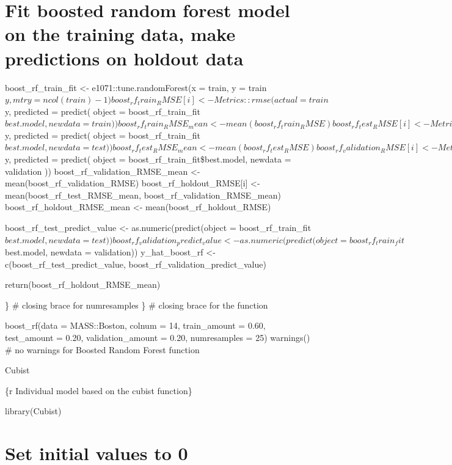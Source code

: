\documentclass[
]{book}
\begin{document}
\chapter{Fit boosted random forest model on the training data, make predictions on holdout data}\label{fit-boosted-random-forest-model-on-the-training-data-make-predictions-on-holdout-data}

boost\_rf\_train\_fit \textless- e1071::tune.randomForest(x = train, y =
train\(y, mtry = ncol(train) - 1)
boost_rf_train_RMSE[i] <- Metrics::rmse(actual = train\)y, predicted =
predict( object = boost\_rf\_train\_fit\(best.model, newdata = train
  ))
boost_rf_train_RMSE_mean <- mean(boost_rf_train_RMSE)
boost_rf_test_RMSE[i] <- Metrics::rmse(actual = test\)y, predicted =
predict( object = boost\_rf\_train\_fit\(best.model, newdata = test
  ))
boost_rf_test_RMSE_mean <- mean(boost_rf_test_RMSE)
boost_rf_validation_RMSE[i] <- Metrics::rmse(actual = validation\)y,
predicted = predict( object = boost\_rf\_train\_fit\$best.model, newdata =
validation )) boost\_rf\_validation\_RMSE\_mean \textless-
mean(boost\_rf\_validation\_RMSE) boost\_rf\_holdout\_RMSE{[}i{]} \textless-
mean(boost\_rf\_test\_RMSE\_mean, boost\_rf\_validation\_RMSE\_mean)
boost\_rf\_holdout\_RMSE\_mean \textless- mean(boost\_rf\_holdout\_RMSE)

boost\_rf\_test\_predict\_value \textless- as.numeric(predict(object =
boost\_rf\_train\_fit\(best.model, newdata = test))
boost_rf_validation_predict_value <- as.numeric(predict(object = boost_rf_train_fit\)best.model,
newdata = validation)) y\_hat\_boost\_rf \textless- c(boost\_rf\_test\_predict\_value,
boost\_rf\_validation\_predict\_value)

return(boost\_rf\_holdout\_RMSE\_mean)

\} \# closing brace for numresamples \} \# closing brace for the function

boost\_rf(data = MASS::Boston, colnum = 14, train\_amount = 0.60,
test\_amount = 0.20, validation\_amount = 0.20, numresamples = 25)
warnings() \# no warnings for Boosted Random Forest function

Cubist

\{r Individual model based on the cubist function\}

library(Cubist)

\chapter{Set initial values to 0}\label{set-initial-values-to-0-3}
\end{document}
